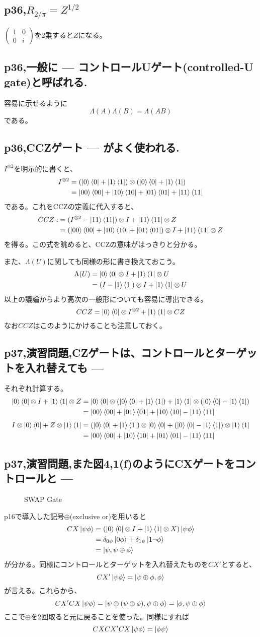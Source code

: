 \documentclass[b5paper,fleqn]{ltjsarticle}
\newcommand\s[1]{\subsection*{#1}\noindent\ignorespaces}
\newcommand\al[1]{\begin{align*}#1\end{align*}}
\newcommand\mat[2]{\left(\begin{array}{#1}#2\end{array}\right)}
\newcommand\qcirc[2]{\begin{figure}[H]\centerline{\Qcircuit{#1}}\caption{#2}\end{figure}}
\begin{document}
\s{p36,$R_{2/\pi}=Z^{1/2}$}
$\mat{cc}{1&0\\0&i}$を2乗すると$Z$になる。
\s{p36,一般に --- コントロールUゲート(controlled-U gate)と呼ばれる.}
容易に示せるように
\[\Lambda(A)\Lambda(B)=\Lambda(AB)\]
である。
\s{p36,CCZゲート --- がよく使われる.}
$I^{\otimes2}$を明示的に書くと、
\al{
  I^{\otimes2}
&=(\ket{0}\bra{0}+\ket{1}\bra{1})\otimes(\ket{0}\bra{0}+\ket{1}\bra{1})\\
&=\ket{00}\bra{00}+\ket{10}\bra{10}+\ket{01}\bra{01}+\ket{11}\bra{11}
}である。これをCCZの定義に代入すると、
\al{
CCZ:&=(I^{\otimes 2}-\ket{11}\bra{11})\otimes I+\ket{11}\bra{11}\otimes Z\\
&=(\ket{00}\bra{00}+\ket{10}\bra{10}+\ket{01}\bra{01})\otimes I+\ket{11}\bra{11}\otimes Z
}を得る。この式を眺めると、CCZの意味がはっきりと分かる。\par
また、$\Lambda(U)$に関しても同様の形に書き換えておこう。
\al{\Lambda(U)
&=\ket{0}\bra{0}\otimes I+\ket{1}\bra{1}\otimes U\\
&=(I-\ket{1}\bra{1})\otimes I+\ket{1}\bra{1}\otimes U
}
以上の議論からより高次の一般形についても容易に導出できる。
\[CCZ=\ket{0}\bra{0}\otimes I^{\otimes 2}+\ket{1}\bra{1}\otimes CZ\]
なお$CCZ$はこのようにかけることも注意しておく。

\s{p37,演習問題,CZゲートは、コントロールとターゲットを入れ替えても ---}
それぞれ計算する。
\al{
\ket{0}\bra{0}\otimes I+\ket{1}\bra{1}\otimes Z
&=\ket{0}\bra{0}\otimes(\ket{0}\bra{0}+\ket{1}\bra{1})+\ket{1}\bra{1}\otimes
(\ket{0}\bra{0}-\ket{1}\bra{1})\\
&=\ket{00}\bra{00}+\ket{01}\bra{01}+\ket{10}\bra{10}-\ket{11}\bra{11}
}
\al{
I\otimes\ket{0}\bra{0}+Z\otimes\ket{1}\bra{1}
&=(\ket{0}\bra{0}+\ket{1}\bra{1})\otimes\ket{0}\bra{0}+(\ket{0}\bra{0}-\ket{1}\bra{1})\otimes\ket{1}\bra{1}\\
&=\ket{00}\bra{00}+\ket{10}\bra{10}+\ket{01}\bra{01}-\ket{11}\bra{11}
}
\s{p37,演習問題,また図4,1(f)のようにCXゲートをコントロールと ---}
\qcirc{
& \ctrl{1} & \targ     & \ctrl{1} & \qw \\
& \targ    & \ctrl{-1} & \targ     & \qw
}{SWAP Gate}
p16で導入した記号$\oplus$(exclusive or)を用いると
\al{CX\ket{\psi\phi}&=(\ket{0}\bra{0}\otimes I+\ket{1}\bra{1}\otimes X)\ket{\psi\phi}\\
&=\delta_{0\psi}\ket{0\phi}+\delta_{1\psi}\ket{1\lnot\phi}\\
&=\ket{\psi,\psi\oplus\phi}
}
が分かる。同様にコントロールとターゲットを入れ替えたものを$CX'$とすると、
\[CX'\ket{\psi\phi}=\ket{\psi\oplus\phi,\phi}\]が言える。これらから、
\[CX'CX\ket{\psi\phi}=\ket{\psi\oplus(\psi\oplus\phi),\psi\oplus\phi}=\ket{\phi,\psi\oplus\phi}\]
ここで$\oplus$を2回取ると元に戻ることを使った。同様にすれば
\[CXCX'CX\ket{\psi\phi}=\ket{\phi\psi}\]
\end{document}
